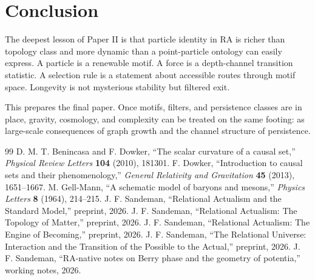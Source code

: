 \documentclass[11pt]{article}
\begin{document}
\section{Conclusion}
The deepest lesson of Paper II is that particle identity in RA is richer than topology class and more dynamic than a point-particle ontology can easily express. A particle is a renewable motif. A force is a depth-channel transition statistic. A selection rule is a statement about accessible routes through motif space. Longevity is not mysterious stability but filtered exit.

This prepares the final paper. Once motifs, filters, and persistence classes are in place, gravity, cosmology, and complexity can be treated on the same footing: as large-scale consequences of graph growth and the channel structure of persistence.

\begin{thebibliography}{99}
 D. M. T. Benincasa and F. Dowker, ``The scalar curvature of a causal set,'' \emph{Physical Review Letters} \textbf{104} (2010), 181301.
 F. Dowker, ``Introduction to causal sets and their phenomenology,'' \emph{General Relativity and Gravitation} \textbf{45} (2013), 1651--1667.
 M. Gell-Mann, ``A schematic model of baryons and mesons,'' \emph{Physics Letters} \textbf{8} (1964), 214--215.
 J. F. Sandeman, ``Relational Actualism and the Standard Model,'' preprint, 2026.
 J. F. Sandeman, ``Relational Actualism: The Topology of Matter,'' preprint, 2026.
 J. F. Sandeman, ``Relational Actualism: The Engine of Becoming,'' preprint, 2026.
 J. F. Sandeman, ``The Relational Universe: Interaction and the Transition of the Possible to the Actual,'' preprint, 2026.
 J. F. Sandeman, ``RA-native notes on Berry phase and the geometry of potentia,'' working notes, 2026.
\end{thebibliography}
\end{document}
